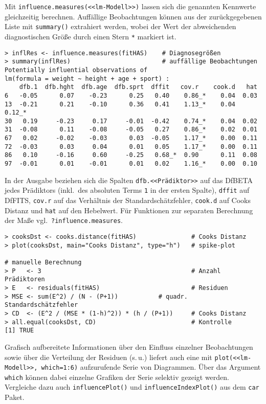 Mit \lstinline!influence.measures(<<lm-Modell>>)! lassen sich die genannten Kennwerte gleichzeitig berechnen. Auffällige Beobachtungen können aus der zurückgegebenen Liste mit \lstinline!summary()! extrahiert werden, wobei der Wert der abweichenden diagnostischen Größe durch einen Stern \lstinline!*! markiert ist.
\begin{lstlisting}
> inflRes <- influence.measures(fitHAS)    # Diagnosegrößen
> summary(inflRes)                         # auffällige Beobachtungen
Potentially influential observations of
lm(formula = weight ~ height + age + sport) :
    dfb.1  dfb.hght  dfb.age  dfb.sprt  dffit   cov.r    cook.d   hat
6   -0.05      0.07    -0.23      0.25   0.40    0.86_*    0.04  0.03
13  -0.21      0.21    -0.10      0.36   0.41    1.13_*    0.04  0.12_*
30   0.19     -0.23     0.17     -0.01  -0.42    0.74_*    0.04  0.02
31  -0.08      0.11    -0.08     -0.05   0.27    0.86_*    0.02  0.01
67   0.02     -0.02    -0.03      0.03  -0.05    1.17_*    0.00  0.11
72  -0.03      0.03     0.04      0.01   0.05    1.17_*    0.00  0.11
86   0.10     -0.16     0.60     -0.25   0.68_*  0.90      0.11  0.08
97  -0.01      0.01    -0.01      0.01   0.02    1.16_*    0.00  0.10
\end{lstlisting}

In der Ausgabe beziehen sich die Spalten \lstinline!dfb.<<Prädiktor>>! auf das DfBETA jedes Prädiktors (inkl.\ des absoluten Terms \lstinline!1! in der ersten Spalte), \lstinline!dffit! auf DfFITS, \lstinline!cov.r! auf das Verhältnis der Standardschätzfehler, \lstinline!cook.d! auf Cooks Distanz und \lstinline!hat! auf den Hebelwert. Für Funktionen zur separaten Berechnung der Maße vgl.\ \lstinline!?influence.measures!.
\begin{lstlisting}
> cooksDst <- cooks.distance(fitHAS)               # Cooks Distanz
> plot(cooksDst, main="Cooks Distanz", type="h")   # spike-plot

# manuelle Berechnung
> P   <- 3                                         # Anzahl Prädiktoren
> E   <- residuals(fitHAS)                         # Residuen
> MSE <- sum(E^2) / (N - (P+1))           # quadr. Standardschätzfehler
> CD  <- (E^2 / (MSE * (1-h)^2)) * (h / (P+1))     # Cooks Distanz
> all.equal(cooksDst, CD)                          # Kontrolle
[1] TRUE
\end{lstlisting}

Grafisch aufbereitete Informationen über den Einfluss einzelner Beobachtungen sowie über die Verteilung der Residuen (s.\,u.) liefert auch eine mit \lstinline!plot(<<lm-Modell>>, which=1:6)! aufzurufende Serie von Diagrammen. Über das Argument \lstinline!which! können dabei einzelne Grafiken der Serie selektiv gezeigt werden. Vergleiche dazu auch \lstinline!influencePlot()! und \lstinline!influenceIndexPlot()! aus dem  \lstinline!car! Paket.

